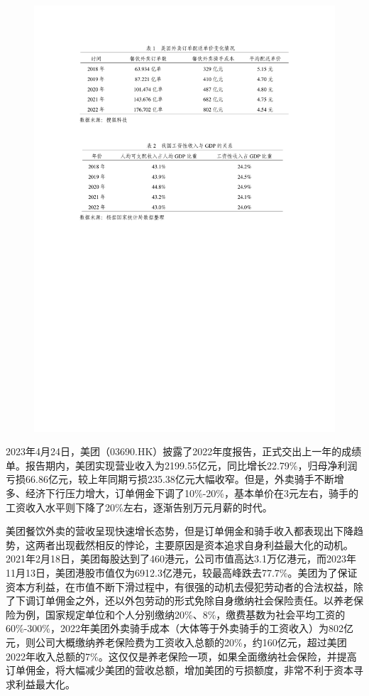 \documentclass[12pt,twoside,utf8]{ctexart}
\begin{document}
\begin{figure}[hbt!]
\centering
\includegraphics[width=1\linewidth]{t1.pdf}
\label{fig:map}
\end{figure}



2023年4月24日，美团（03690.HK）披露了2022年度报告，正式交出上一年的成绩单。报告期内，美团实现营业收入为2199.55亿元，同比增长22.79\%，归母净利润亏损66.86亿元，较上年同期亏损235.38亿元大幅收窄。但是，外卖骑手不断增多、经济下行压力增大，订单佣金下调了10\%-20\%，基本单价在3元左右，骑手的工资收入水平则下降了20\%左右，逐渐告别万元月薪的时代。

美团餐饮外卖的营收呈现快速增长态势，但是订单佣金和骑手收入都表现出下降趋势，这两者出现截然相反的悖论，主要原因是资本追求自身利益最大化的动机。2021年2月18日，美团每股达到了460港元，公司市值高达3.1万亿港元，而2023年11月13日，美团港股市值仅为6912.3亿港元，较最高峰跌去77.7\%。美团为了保证资本方利益，在市值不断下滑过程中，有很强的动机去侵犯劳动者的合法权益，除了下调订单佣金之外，还以外包劳动的形式免除自身缴纳社会保险责任。以养老保险为例，国家规定单位和个人分别缴纳20\%、8\%，缴费基数为社会平均工资的60\%-300\%，2022年美团外卖骑手成本（大体等于外卖骑手的工资收入）为802亿元，则公司大概缴纳养老保险费为工资收入总额的20\%，约160亿元，超过美团2022年收入总额的7\%。这仅仅是养老保险一项，如果全面缴纳社会保险，并提高订单佣金，将大幅减少美团的营收总额，增加美团的亏损额度，非常不利于资本寻求利益最大化。
\end{document}
